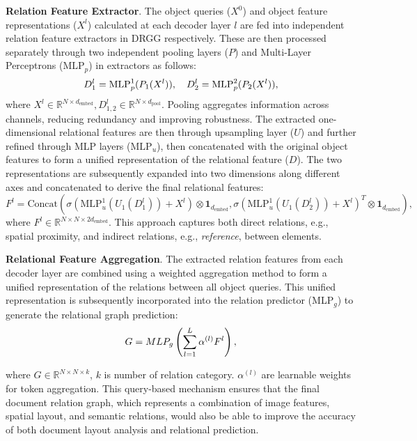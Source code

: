\textbf{Relation Feature Extractor}. The object queries ($X^0$) and object feature representations ($X^l$) calculated at each decoder layer $l$ are fed into independent relation feature extractors {in DRGG respectively}. These are then processed separately through two independent pooling layers ($P$) and Multi-Layer Perceptrons ($\text{MLP}_p$) in extractors as follows:
\vspace{-2px}
\begin{equation}
D^l_1 = \text{MLP}^1_p(P_1(X^l)), \quad D^l_2 = \text{MLP}^2_p(P_2(X^l)),
\vspace{-2px}
\end{equation}
where $X^l \in \mathbb{R}^{N \times d_{\text{embed}}}, D^l_{1,2} \in \mathbb{R}^{N \times d_{\text{pool}}}$. Pooling aggregates information across channels, reducing redundancy and improving robustness.  The extracted one-dimensional relational features are then through upsampling layer ($U$) and further refined through MLP layers ($\text{MLP}_u$), then concatenated with the original object features to form a unified representation of the relational feature ($D$). The two representations are subsequently expanded into two dimensions along different axes and concatenated to derive the final relational features:
\begin{equation}
F^l = \text{Concat}(\sigma(\text{MLP}^1_u(U_1(D^l_1)) + X^l) \otimes \mathbf{1}_{d_{\text{embed}}}, \sigma(\text{MLP}^1_u(U_1(D^l_2)) + X^l)^T \otimes \mathbf{1}_{d_{\text{embed}}}),
\end{equation}
where $F^l \in \mathbb{R}^{N \times N \times 2d_{\text{embed}}}$. This approach captures both direct relations, e.g., spatial proximity, and indirect relations, e.g., \textit{reference}, between elements.

\textbf{Relational Feature Aggregation}. The extracted relation features from each decoder layer are combined using a weighted aggregation method to form a unified representation of the relations between all object queries. This unified representation is subsequently incorporated into the relation predictor (MLP$_{g}$) to generate the relational graph prediction:
\vspace{-5px}
\begin{equation} 
G = MLP_{g} \left( \sum_{l=1}^{L} \alpha^{(l)} F^l\right),
\label{eq：DRGG}
\vspace{-5px}
\end{equation}

where $G \in \mathbb{R}^{N \times N \times k}$, $k$ is number of relation category. \( \alpha^{(l)} \) are learnable weights for token aggregation. This query-based mechanism ensures that the final document relation graph, which represents a combination of image features, spatial layout, and semantic relations, would also be able to improve the accuracy of both document layout analysis and relational prediction. 

